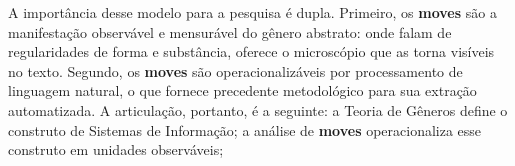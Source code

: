 A importância desse modelo para a pesquisa é dupla. Primeiro, os \textbf{moves} são a manifestação observável e mensurável do gênero abstrato: onde \cite{GenresOrgComm} falam de regularidades de forma e substância, \cite{GenreAnalysis} oferece o microscópio que as torna visíveis no texto. Segundo, os \textbf{moves} são operacionalizáveis por processamento de linguagem natural, o que fornece precedente metodológico para sua extração automatizada. A articulação, portanto, é a seguinte: a Teoria de Gêneros define o construto de Sistemas de Informação; a análise de \textbf{moves} operacionaliza esse construto em unidades observáveis; 






